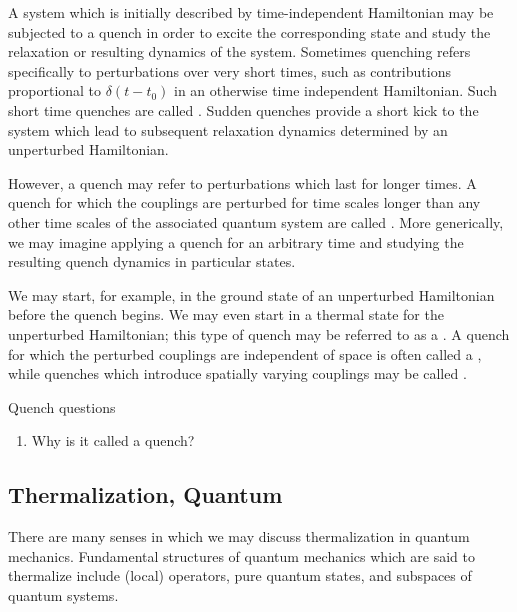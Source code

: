 A system which is initially described by time-independent Hamiltonian may be subjected to a quench in order to excite the corresponding state and study the relaxation or resulting dynamics of the system.
%
Sometimes quenching refers specifically to perturbations over very short times, such as contributions proportional to  \(\delta(t-t_0)\) in an otherwise time independent Hamiltonian.
%
Such short time quenches are called .
%
Sudden quenches provide a short kick to the system which lead to subsequent relaxation dynamics determined by an unperturbed Hamiltonian.

However, a quench may refer to perturbations which last for longer times.
%
A quench for which the couplings are perturbed for time scales longer than any other time scales of the associated quantum system are called .
%
More generically, we may imagine applying a quench for an arbitrary time and studying the resulting quench dynamics in particular states.

We may start, for example, in the ground state of an unperturbed Hamiltonian before the quench begins.
%
We may even start in a thermal state for the unperturbed Hamiltonian; this type of quench may be referred to as a .
%
A quench for which the perturbed couplings are independent of space is often called a , while quenches which introduce spatially varying couplings may be called .

\begin{question}{Quench questions}{}

\begin{enumerate}
    \item Why is it called a quench?
\end{enumerate}

\end{question}





\subsection{Thermalization, Quantum}
There are many senses in which we may discuss thermalization in quantum mechanics.
%
Fundamental structures of quantum mechanics which are said to thermalize include (local) operators, pure quantum states, and subspaces of quantum systems.

